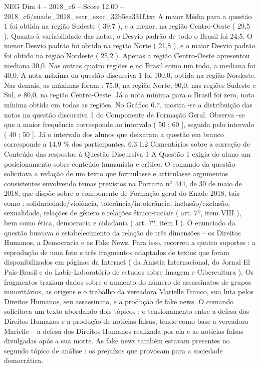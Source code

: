 \begin{textsample}{NEG Dim 4 – 2018\_c6 – Score 12.00 – 2018\_c6/enade\_2018\_secr\_exec\_32b5ea331f.txt}
A maior Média para a questão 1 foi obtida na região Sudeste ( 39,7 ), e a menor, na região Centro-Oeste ( 29,5 ).
Quanto à variabilidade das notas, o Desvio padrão de todo o Brasil foi 24,5.
O menor Desvio padrão foi obtido na região Norte ( 21,8 ), e o maior Desvio padrão foi obtido na região Nordeste ( 25,2 ).
Apenas a região Centro-Oeste apresentou mediana 30,0.
Nas outras quatro regiões e no Brasil como um todo, a mediana foi 40,0.
A nota máxima da questão discursiva 1 foi 100,0, obtida na região Nordeste.
Nas demais, as máximas foram : 75,0, na região Norte, 90,0, nas regiões Sudeste e Sul, e 80,0, na região Centro-Oeste.
Já a nota mínima para o Brasil foi zero, nota mínima obtida em todas as regiões.
No Gráfico 6.7, mostra -se a distribuição das notas na questão discursiva 1 do Componente de Formação Geral.
Observa -se que a maior frequência corresponde ao intervalo ( 50 ; 60 ], seguida pelo intervalo ( 40 ; 50 ].
Já o intervalo dos alunos que deixaram a questão em branco corresponde a 14,9 \% dos participantes. 6.3.1.2 Comentários sobre a correção de Conteúdo das respostas à Questão Discursiva 1 A Questão 1 exigia do aluno um posicionamento sobre conteúdo humanista e crítico.
O comando da questão solicitava a redação de um texto que formulasse e articulasse argumentos consistentes envolvendo temas previstos na Portaria nº 444, de 30 de maio de 2018, que dispõe sobre o componente de Formação geral do Enade 2018, tais como : solidariedade/violência, tolerância/intolerância, inclusão/exclusão, sexualidade, relações de gênero e relações étnico-raciais ( art. 7º, item VIII ), bem como ética, democracia e cidadania ( art. 7º, item I ).
O enunciado da questão buscava o estabelecimento da relação de três dimensões – os Direitos Humanos, a Democracia e as Fake News.
Para isso, recorreu a quatro suportes : a reprodução de uma foto e três fragmentos adaptados de textos que foram disponibilizados em páginas da Internet ( da Anistia Internacional, do Jornal El País-Brasil e do Labic-Laboratório de estudos sobre Imagem e Cibercultura ).
Os fragmentos traziam dados sobre o aumento do número de assassinatos de grupos minoritários, as origens e o trabalho da vereadora Marielle Franco, sua luta pelos Direitos Humanos, seu assassinato, e a produção de fake news.
O comando solicitava um texto abordando dois tópicos : o tensionamento entre a defesa dos Direitos Humanos e a produção de notícias falsas, tendo como base a vereadora Marielle – a defesa dos Direitos Humanos realizada por ela e as notícias falsas divulgadas após a sua morte.
As fake news também estavam presentes no segundo tópico de análise : os prejuízos que provocam para a sociedade democrática.

\end{textsample}
